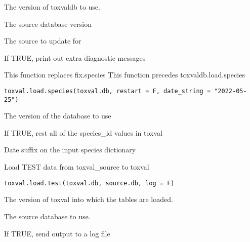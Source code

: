 \documentclass[letterpaper]{book}
\begin{document}
%
\begin{Arguments}
\begin{ldescription}
\item[\code{toxval.db}] The version of toxvaldb to use.

\item[\code{source.db}] The source database version

\item[\code{source}] The source to update for

\item[\code{verbose}] If TRUE, print out extra diagnostic messages
\end{ldescription}
\end{Arguments}
%
\begin{Description}\relax
This function replaces fix.species
This function precedes toxvaldb.load.species
\end{Description}
%
\begin{Usage}
\begin{verbatim}
toxval.load.species(toxval.db, restart = F, date_string = "2022-05-25")
\end{verbatim}
\end{Usage}
%
\begin{Arguments}
\begin{ldescription}
\item[\code{toxval.db}] The version of the database to use

\item[\code{restart}] If TRUE, rest all of the species\_id values in toxval

\item[\code{date.string}] Date suffix on the input species dictionary
\end{ldescription}
\end{Arguments}
%
\begin{Description}\relax
Load TEST data from toxval\_source to toxval
\end{Description}
%
\begin{Usage}
\begin{verbatim}
toxval.load.test(toxval.db, source.db, log = F)
\end{verbatim}
\end{Usage}
%
\begin{Arguments}
\begin{ldescription}
\item[\code{toxval.db}] The version of toxval into which the tables are loaded.

\item[\code{source.db}] The source database to use.

\item[\code{log}] If TRUE, send output to a log file
\end{ldescription}
\end{Arguments}
\end{document}
